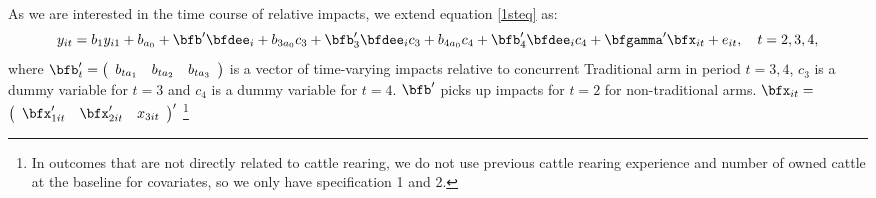 	As we are interested in the time course of relative impacts, we extend equation \eqref{1steq} as:
	\begin{equation}
	y_{it}=b_{1}y_{i1}+b_{a_{0}}+\bfb'_{}\bfdee_{i}+b_{3a_{0}}c_{3}+\bfb'_{3}\bfdee_{i}c_{3}+b_{4a_{0}}c_{4}+\bfb'_{4}\bfdee_{i}c_{4}+\bfgamma'\bfx_{it}+e_{it}, \quad t=2, 3, 4,
	\label{2ndeq}
	\end{equation}
	where $\bfb'_{t}=\left(
	\begin{array}{ccc}
	b_{ta_{1}} & b_{ta_{2}} & b_{ta_{3}}
	\end{array}
	\right)$ is a vector of time-varying impacts relative to concurrent \textsf{Traditional} arm in period $t=3, 4$, $c_{3}$ is a dummy variable for $t=3$ and $c_{4}$ is a dummy variable for $t=4$. $\bfb'_{}$ picks up impacts for $t=2$ for non-traditional arms. $\bfx_{it}=$ $\left(
	\begin{array}{ccc}
	\bfx'_{1it} & \bfx'_{2it} & x_{3it}
	\end{array}
	\right)'$ \footnote{In outcomes that are not directly related to cattle rearing, we do not use previous cattle rearing experience and number of owned cattle at the baseline for covariates, so we only have specification 1 and 2. }




